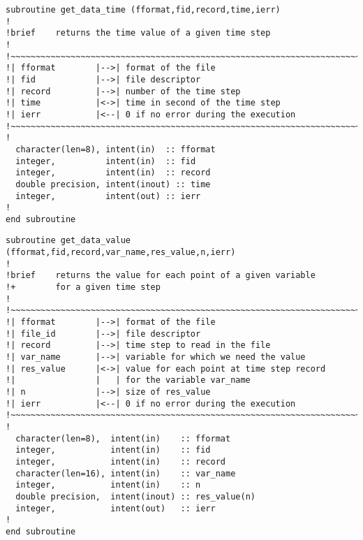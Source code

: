 %
\begin{lstlisting}
subroutine get_data_time (fformat,fid,record,time,ierr)
!
!brief    returns the time value of a given time step
!
!~~~~~~~~~~~~~~~~~~~~~~~~~~~~~~~~~~~~~~~~~~~~~~~~~~~~~~~~~~~~~~~~~~~~~~~
!| fformat        |-->| format of the file
!| fid            |-->| file descriptor
!| record         |-->| number of the time step
!| time           |<->| time in second of the time step
!| ierr           |<--| 0 if no error during the execution
!~~~~~~~~~~~~~~~~~~~~~~~~~~~~~~~~~~~~~~~~~~~~~~~~~~~~~~~~~~~~~~~~~~~~~~~
!
  character(len=8), intent(in)  :: fformat
  integer,          intent(in)  :: fid
  integer,          intent(in)  :: record
  double precision, intent(inout) :: time
  integer,          intent(out) :: ierr
!
end subroutine
\end{lstlisting}
%
\begin{lstlisting}
subroutine get_data_value (fformat,fid,record,var_name,res_value,n,ierr)
!
!brief    returns the value for each point of a given variable 
!+        for a given time step
!
!~~~~~~~~~~~~~~~~~~~~~~~~~~~~~~~~~~~~~~~~~~~~~~~~~~~~~~~~~~~~~~~~~~~~~~~
!| fformat        |-->| format of the file
!| file_id        |-->| file descriptor
!| record         |-->| time step to read in the file
!| var_name       |-->| variable for which we need the value
!| res_value      |<->| value for each point at time step record 
!|                |   | for the variable var_name
!| n              |-->| size of res_value
!| ierr           |<--| 0 if no error during the execution
!~~~~~~~~~~~~~~~~~~~~~~~~~~~~~~~~~~~~~~~~~~~~~~~~~~~~~~~~~~~~~~~~~~~~~~~
!
  character(len=8),  intent(in)    :: fformat
  integer,           intent(in)    :: fid
  integer,           intent(in)    :: record
  character(len=16), intent(in)    :: var_name
  integer,           intent(in)    :: n
  double precision,  intent(inout) :: res_value(n)
  integer,           intent(out)   :: ierr
!
end subroutine
\end{lstlisting}
%
